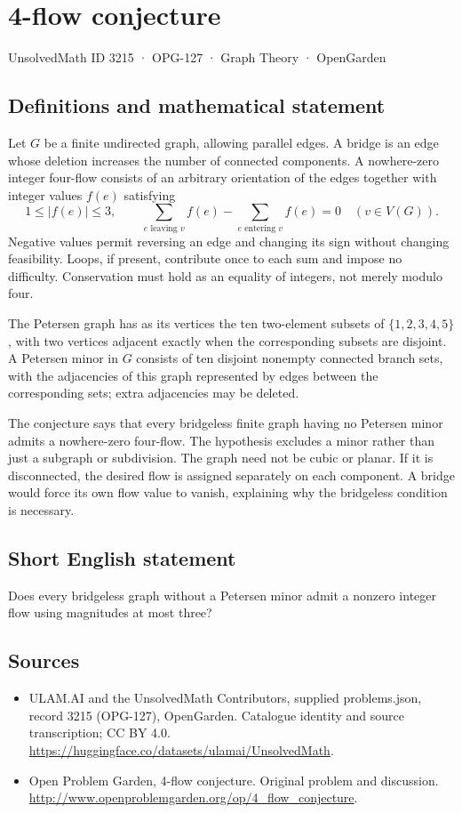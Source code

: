 \documentclass[11pt,a4paper]{article}
\begin{document}
\section*{4-flow conjecture}\label{3215}
{\small UnsolvedMath ID 3215 · OPG-127 · Graph Theory · OpenGarden}
\subsection{Definitions and mathematical statement}
Let $G$ be a finite undirected graph, allowing parallel edges. A bridge is an edge whose deletion increases the number of connected components. A nowhere-zero integer four-flow consists of an arbitrary orientation of the edges together with integer values $f(e)$ satisfying
\[
 1\le |f(e)|\le3,
 \qquad \sum_{e\text{ leaving }v}f(e)
       -\sum_{e\text{ entering }v}f(e)=0
       \quad(v\in V(G)).
\]
Negative values permit reversing an edge and changing its sign without changing feasibility. Loops, if present, contribute once to each sum and impose no difficulty. Conservation must hold as an equality of integers, not merely modulo four.

The Petersen graph has as its vertices the ten two-element subsets of $\{1,2,3,4,5\}$, with two vertices adjacent exactly when the corresponding subsets are disjoint. A Petersen minor in $G$ consists of ten disjoint nonempty connected branch sets, with the adjacencies of this graph represented by edges between the corresponding sets; extra adjacencies may be deleted.

The conjecture says that every bridgeless finite graph having no Petersen minor admits a nowhere-zero four-flow. The hypothesis excludes a minor rather than just a subgraph or subdivision. The graph need not be cubic or planar. If it is disconnected, the desired flow is assigned separately on each component. A bridge would force its own flow value to vanish, explaining why the bridgeless condition is necessary.
\subsection{Short English statement}
Does every bridgeless graph without a Petersen minor admit a nonzero integer flow using magnitudes at most three?
\subsection{Sources}
\begin{itemize}
\item[S1] ULAM.AI and the UnsolvedMath Contributors, supplied problems.json, record 3215 (OPG-127), OpenGarden. Catalogue identity and source transcription; CC BY 4.0.
\url{https://huggingface.co/datasets/ulamai/UnsolvedMath}.
\item[S2] Open Problem Garden, 4-flow conjecture. Original problem and discussion.
\url{http://www.openproblemgarden.org/op/4_flow_conjecture}.
\end{itemize}
\end{document}

